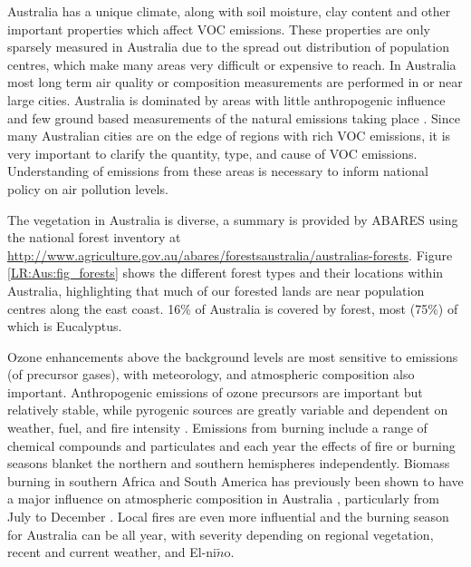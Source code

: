   Australia has a unique climate, along with soil moisture, clay content and other important properties which affect VOC emissions.
  These properties are only sparsely measured in Australia due to the spread out distribution of population centres, which make many areas very difficult or expensive to reach.
  In Australia most long term air quality or composition measurements are performed in or near large cities.
  Australia is dominated by areas with little anthropogenic influence and few ground based measurements of the natural emissions taking place \parencite{VanDerA2008}.
  Since many Australian cities are on the edge of regions with rich VOC emissions, it is very important to clarify the quantity, type, and cause of VOC emissions.
  Understanding of emissions from these areas is necessary to inform national policy on air pollution levels.
  
  The vegetation in Australia is diverse, a summary is provided by ABARES using the national forest inventory at  \url{http://www.agriculture.gov.au/abares/forestsaustralia/australias-forests}.
  Figure \ref{LR:Aus:fig_forests} shows the different forest types and their locations within Australia, highlighting that much of our forested lands are near population centres along the east coast.
  16\% of Australia is covered by forest, most (75\%) of which is Eucalyptus.
  
  
  Ozone enhancements above the background levels are most sensitive to emissions (of precursor gases), with meteorology, and atmospheric composition also important.
  Anthropogenic emissions of ozone precursors are important but relatively stable, while pyrogenic sources are greatly variable and dependent on weather, fuel, and fire intensity \parencite[e.g.][]{Lawson2017}. 
  Emissions from burning include a range of chemical compounds and particulates and each year the effects of fire or burning seasons blanket the northern and southern hemispheres independently.
  Biomass burning in southern Africa and South America has previously been shown to have a major influence on atmospheric composition in Australia \parencite{Oltmans2001, Gloudemans2006, Edwards2006}, particularly from July to December \parencite{Pak2003, Liu2016}.
  Local fires are even more influential and the burning season for Australia can be all year, with severity depending on regional vegetation, recent and current weather, and El-ni$\tilde{n}$o.
  
